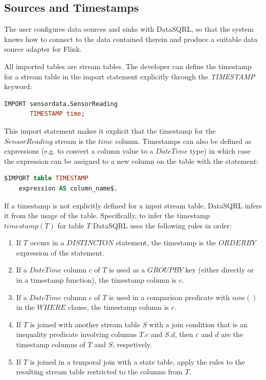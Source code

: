 \documentclass[	DIV=calc,%
							paper=letter,%
							fontsize=11pt,%
							twocolumn]{scrartcl}	 					%
\begin{document}
\subsection{Sources and Timestamps}
\label{sec:datasqrl-source}

The user configures data sources and sinks with DataSQRL, so that the system knows how to connect to the data contained therein and produce a suitable data source adapter for Flink.

All imported tables are stream tables. The developer can define the timestamp for a stream table in the import statement explicitly through the \emph{TIMESTAMP} keyword:
\begin{lstlisting}[language=SQL]
IMPORT sensordata.SensorReading
       TIMESTAMP time;
\end{lstlisting}

This import statement makes it explicit that the timestamp for the $SensorReading$ stream is the $time$ column. Timestamps can also be defined as expressions (e.g. to convert a column value to a $DateTime$ type) in which case the expression can be assigned to a new column on the table with the statement:

\begin{lstlisting}[language=SQL]
$IMPORT table TIMESTAMP
    expression AS column_name$.
\end{lstlisting}

If a timestamp is not explicitly defined for a input stream table, DataSQRL infers it from the usage of the table. Specifically, to infer the timestamp $timestamp(T)$ for table $T$ DataSQRL uses the following rules in order:
\begin{enumerate}
    \item If $T$ occurs in a $DISTINCT ON$ statement, the timestamp is the $ORDER BY$ expression of the statement.
    \item If a $DateTime$ column $c$ of $T$ is used as a $GROUP BY$ key (either directly or in a timestamp function), the timestamp column is $c$.
    \item If a $DateTime$ column $c$ of $T$ is used in a comparison predicate with $now()$ in the $WHERE$ clause, the timestamp column is $c$.
    \item If $T$ is joined with another stream table $S$ with a join condition that is an inequality predicate involving columns $T.c$ and $S.d$, then $c$ and $d$ are the timestamp columns of $T$ and $S$, respetively.
    \item If $T$ is joined in a temporal join with a state table, apply the rules to the resulting stream table restricted to the columns from $T$.
\end{enumerate}
\end{document}
